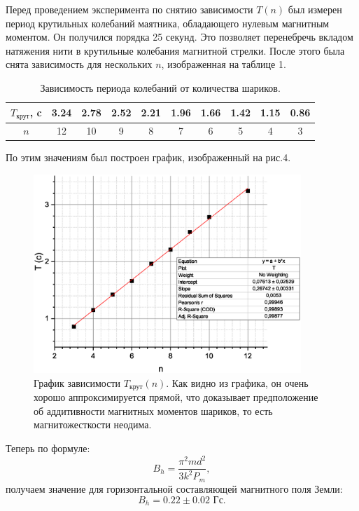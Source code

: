 \documentclass[a4paper, 14pt]{extarticle}%
\newcommand\ECaption[1]{%
     \captionsetup{font=footnotesize}%
     \caption{#1}}
\begin{document}
Перед проведением эксперимента по снятию зависимости $T(n)$ был измерен период крутильных колебаний маятника, обладающего нулевым магнитным моментом. Он получился порядка 25 секунд. Это позволяет перенебречь вкладом натяжения нити в крутильные колебания магнитной стрелки. После этого была снята зависимость для нескольких $n$, изображенная на таблице 1.
\begin{table}[h!]
\begin{center}
\begin{tabular}{|c|c|c|c|c|c|c|c|c|c|}
\hline
\rowcolor[HTML]{9698ED} 
$T_{\text{крут}}$, c & 3.24 & 2.78 & 2.52 & 2.21 & 1.96 & 1.66 & 1.42 & 1.15 & 0.86 \\ \hline
$n$                  & 12   & 10   & 9    & 8    & 7    & 6    & 5    & 4    & 3    \\ \hline
\end{tabular}
\ECaption{Зависимость периода колебаний от количества шариков.}
\end{center}
\end{table}

По этим значениям был построен график, изображенный на рис.4.

\begin{figure}[h!]
\begin{center}
\includegraphics[width=0.9\textwidth]{grkr}
\end{center}
\ECaption{График зависимости $T_{\text{крут}}(n)$. Как видно из графика, он очень хорошо аппроксимируется прямой, что доказывает предположение об аддитивности магнитных моментов шариков, то есть магнитожесткости неодима. }
\end{figure}

Теперь по формуле:
\[B_h = \dfrac{\pi^2md^2}{3k^2P_m},\]
получаем значение для горизонтальной составляющей магнитного поля Земли:
\[B_h = 0.22\pm 0.02 \text{ Гс}.\]
\newpage
\end{document}
